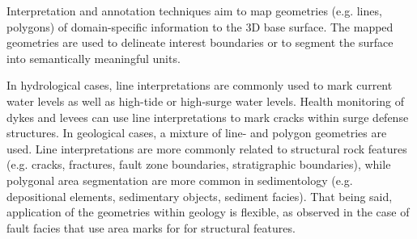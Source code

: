 \documentclass[review]{elsarticle}
\begin{document}

Interpretation and annotation techniques aim to map geometries (e.g. lines, polygons) of domain-specific information to the 3D base surface. The mapped geometries are used to delineate interest boundaries or to segment the surface into semantically meaningful units.


In hydrological cases, line interpretations are commonly used to mark current water levels as well as high-tide or high-surge water levels. Health monitoring of dykes and levees can use line interpretations to mark cracks within surge defense structures. In geological cases, a mixture of line- and polygon geometries are used. Line interpretations are more commonly related to structural rock features (e.g. cracks, fractures, fault zone boundaries, stratigraphic boundaries), while polygonal area segmentation are more common in sedimentology (e.g. depositional elements, sedimentary objects, sediment facies). That being said, application of the geometries within geology is flexible, as observed in the case of fault facies that use area marks for for structural features.

\end{document}
